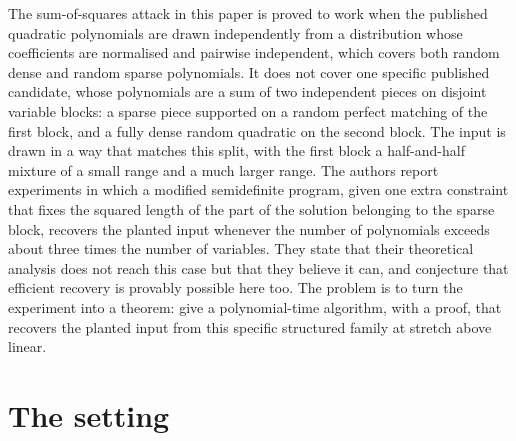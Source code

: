 \documentclass{aicr-conjecture}
\begin{document}

\vspace{0.4em}

\begin{informalconjecture}
The sum-of-squares attack in this paper is proved to work when the
published quadratic polynomials are drawn independently from a
distribution whose coefficients are normalised and pairwise
independent, which covers both random dense and random sparse
polynomials. It does not cover one specific published candidate, whose
polynomials are a sum of two independent pieces on disjoint variable
blocks: a sparse piece supported on a random perfect matching of the
first block, and a fully dense random quadratic on the second block.
The input is drawn in a way that matches this split, with the first
block a half-and-half mixture of a small range and a much larger range.
The authors report experiments in which a modified semidefinite
program, given one extra constraint that fixes the squared length of
the part of the solution belonging to the sparse block, recovers the
planted input whenever the number of polynomials exceeds about three
times the number of variables. They state that their theoretical
analysis does not reach this case but that they believe it can, and
conjecture that efficient recovery is provably possible here too. The
problem is to turn the experiment into a theorem: give a
polynomial-time algorithm, with a proof, that recovers the planted
input from this specific structured family at stretch above linear.
\end{informalconjecture}

\section{The setting}\label{sec:setting}
\end{document}
